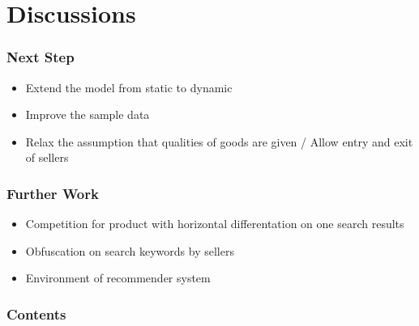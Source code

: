\documentclass{beamer}
\begin{document}
\section{Discussions}
\begin{frame}
\frametitle{Next Step}
\begin{itemize}
\item Extend the model from static to dynamic
\item Improve the sample data
\item Relax the assumption that qualities of goods are given / Allow entry and exit of sellers 
\end{itemize}
\end{frame}

\begin{frame}
\frametitle{Further Work}
\begin{itemize}
\item Competition for product with horizontal differentation on one search results
\item Obfuscation on search keywords by sellers
\item Environment of recommender system 
\end{itemize}
\end{frame}


\begin{frame}[plain]
\frametitle{Contents}
\tableofcontents[hideallsubsections]
\end{frame}
\end{document}
